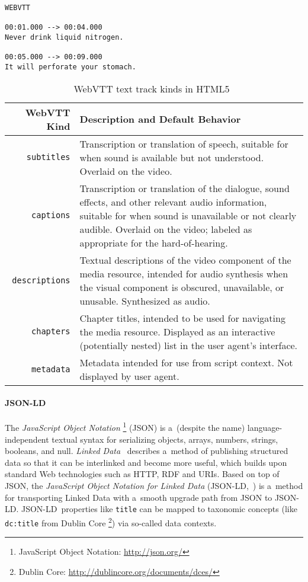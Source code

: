 \documentclass{sig-alternate-ceur}
\newcommand{\inlinelistingsize}{\fontsize{8pt}{11pt}}
\let\oldurl\url
\renewcommand{\url}[1]{\inlinelistingsize\oldurl{#1}}
\def\JSONLD{\mbox{JSON-LD}}
\begin{document}
\begin{lstlisting}[caption={Example WebVTT file with two cues},
  label=listing:webvtt-example, float=b!]
WEBVTT

00:01.000 --> 00:04.000
Never drink liquid nitrogen.

00:05.000 --> 00:09.000
It will perforate your stomach.
\end{lstlisting}


\begin{table}[b!]\footnotesize
\begin{tabular}{ r | p{5.5cm} } %
WebVTT Kind & Description and Default Behavior\\
\hline
\texttt{subtitles} & Transcription or translation of speech,
suitable for when sound is available but not understood.
Overlaid on the video.\\

\texttt{captions} & Transcription or translation of the dialogue,
sound effects, and other relevant audio information,
suitable for when sound is unavailable or not clearly audible.
Overlaid on the video;
labeled as appropriate for the hard-of-hearing.\\

\texttt{descriptions} & Textual descriptions of the video component
of the media resource, intended for audio synthesis
when the visual component is obscured, unavailable, or unusable.
Synthesized as audio.\\

\texttt{chapters} & Chapter titles, intended to be used for navigating
the media resource. Displayed as an interactive (potentially nested)
list in the user agent's interface.\\

\texttt{metadata} & Metadata intended for use from script context.
Not displayed by user agent.\\
\end{tabular}
  \caption{WebVTT text track kinds in HTML5~\cite{berjon2013html5}}
  \label{table:texttrackkinds}
\end{table}

\paragraph{\JSONLD}

The \emph{JavaScript Object Notation}%
\footnote{JavaScript Object Notation: \url{http://json.org/}}
(JSON)
is a~(despite the name) language-independent textual syntax
for serializing objects, arrays, numbers, strings, booleans, and null.
\emph{Linked Data}~\cite{bizer2009linkeddata}
describes a~method of publishing structured data
so that it can be interlinked and become more useful,
which builds upon standard Web technologies such as HTTP, RDF and URIs.
Based on top of JSON, the
\emph{JavaScript Object Notation for Linked Data}
(\JSONLD,~\cite{sporny2013jsonld}) is a~method for transporting
Linked Data with a~smooth upgrade path from JSON to \JSONLD.
\JSONLD\ properties like \texttt{title} can be mapped to taxonomic
concepts (like \texttt{dc:title} from Dublin Core%
\footnote{Dublin Core: \url{http://dublincore.org/documents/dces/}})
via so-called data contexts.
\end{document}
